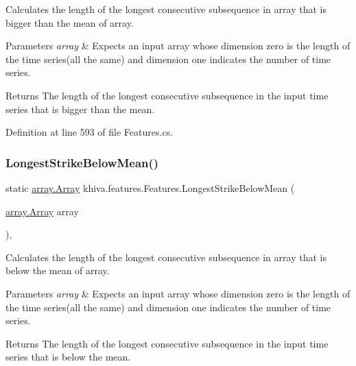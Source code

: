 Calculates the length of the longest consecutive subsequence in array that is bigger than the mean of array. 


\begin{DoxyParams}{Parameters}
{\em array} & Expects an input array whose dimension zero is the length of the time series(all the same) and dimension one indicates the number of time series.\\
\hline
\end{DoxyParams}
\begin{DoxyReturn}{Returns}
The length of the longest consecutive subsequence in the input time series that is bigger than the mean.
\end{DoxyReturn}


Definition at line 593 of file Features.\+cs.

\mbox{\label{classkhiva_1_1features_1_1_features_a271a7e30ff4941af9df98d042c4d7cd4}} 
\subsubsection{\texorpdfstring{Longest\+Strike\+Below\+Mean()}{LongestStrikeBelowMean()}}
{\footnotesize\ttfamily static \mbox{\hyperlink{classkhiva_1_1array_1_1_array}{array.\+Array}} khiva.\+features.\+Features.\+Longest\+Strike\+Below\+Mean (\begin{DoxyParamCaption}\item[{\mbox{\hyperlink{classkhiva_1_1array_1_1_array}{array.\+Array}}}]{array }\end{DoxyParamCaption})\hspace{0.3cm}{\ttfamily [inline]}, {\ttfamily [static]}}



Calculates the length of the longest consecutive subsequence in array that is below the mean of array. 


\begin{DoxyParams}{Parameters}
{\em array} & Expects an input array whose dimension zero is the length of the time series(all the same) and dimension one indicates the number of time series.\\
\hline
\end{DoxyParams}
\begin{DoxyReturn}{Returns}
The length of the longest consecutive subsequence in the input time series that is below the mean.
\end{DoxyReturn}


